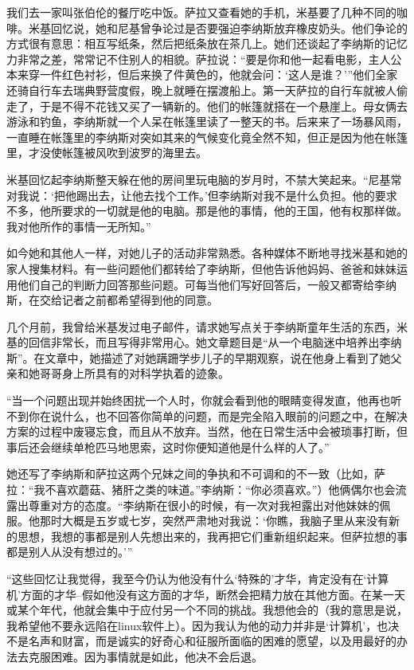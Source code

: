我们去一家叫张伯伦的餐厅吃中饭。萨拉又查看她的手机，米基要了几种不同的咖啡。米基回忆说，她和尼基曾争论过是否要强迫李纳斯放弃橡皮奶头。他们争论的方式很有意思：相互写纸条，然后把纸条放在茶几上。她们还谈起了李纳斯的记忆力非常之差，常常记不住别人的相貌。萨拉说：“要是你和他一起看电影，主人公本来穿一件红色衬衫，但后来换了件黄色的，他就会问：‘这人是谁？’”他们全家还骑自行车去瑞典野营度假，晚上就睡在摆渡船上。第一天萨拉的自行车就被人偷走了，于是不得不花钱又买了一辆新的。他们的帐篷就搭在一个悬崖上。母女俩去游泳和钓鱼，李纳斯就一个人呆在帐篷里读了一整天的书。后来来了一场暴风雨，一直睡在帐篷里的李纳斯对突如其来的气候变化竟全然不知，但正是因为他在帐篷里，才没使帐篷被风吹到波罗的海里去。

米基回忆起李纳斯整天躲在他的房间里玩电脑的岁月时，不禁大笑起来。“尼基常对我说：‘把他踢出去，让他去找个工作。’但李纳斯对我不是什么负担。他的要求不多，他所要求的一切就是他的电脑。那是他的事情，他的王国，他有权那样做。我对他所作的事情一无所知。”

如今她和其他人一样，对她儿子的活动非常熟悉。各种媒体不断地寻找米基和她的家人搜集材料。有一些问题他们都转给了李纳斯，但他告诉他妈妈、爸爸和妹妹运用他们自己的判断力回答那些问题。可每当他们写好回答后，一般又都寄给李纳斯，在交给记者之前都希望得到他的同意。

几个月前，我曾给米基发过电子邮件，请求她写点关于李纳斯童年生活的东西，米基的回信非常长，而且写得非常用心。她文章题目是“从一个电脑迷中培养出李纳斯”。在文章中，她描述了对她蹒跚学步儿子的早期观察，说在他身上看到了她父亲和她哥哥身上所具有的对科学执着的迹象。

“当一个问题出现并始终困扰一个人时，你就会看到他的眼睛变得发直，他再也听不到你在说什么，也不回答你简单的问题，而是完全陷入眼前的问题之中，在解决方案的过程中废寝忘食，而且从不放弃。当然，他在日常生活中会被琐事打断，但事后还会继续单枪匹马地思索，这时你便知道他是什么样的人了。”

她还写了李纳斯和萨拉这两个兄妹之间的争执和不可调和的不一致（比如，萨拉：“我不喜欢蘑菇、猪肝之类的味道。”李纳斯：“你必须喜欢。”）他俩偶尔也会流露出尊重对方的态度。“李纳斯在很小的时候，有一次对我袒露出对他妹妹的佩服。他那时大概是五岁或七岁，突然严肃地对我说：‘你瞧，我脑子里从来没有新的思想，我想的事都是别人先想出来的，我再把它们重新组织起来。但萨拉想的事都是别人从没有想过的。’”

“这些回忆让我觉得，我至今仍认为他没有什么‘特殊的’才华，肯定没有在‘计算机’方面的才华--假如他没有这方面的才华，断然会把精力放在其他方面。在某一天或某个年代，他就会集中于应付另一个不同的挑战。我想他会的（我的意思是说，我希望他不要永远陷在linux软件上）。因为我认为他的动力并非是‘计算机’，也决不是名声和财富，而是诚实的好奇心和征服所面临的困难的愿望，以及用最好的办法去克服困难。因为事情就是如此，他决不会后退。


